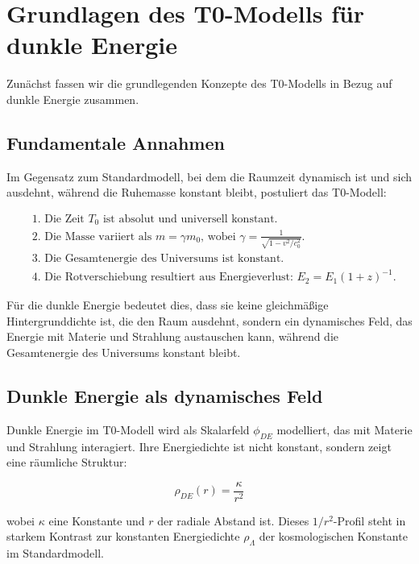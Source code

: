 \documentclass[a4paper,12pt]{article}
\theoremstyle{definition}
\theoremstyle{remark}
\begin{document}
	\section{Grundlagen des T0-Modells für dunkle Energie}
	Zunächst fassen wir die grundlegenden Konzepte des T0-Modells in Bezug auf dunkle Energie zusammen.
	
	\subsection{Fundamentale Annahmen}
	Im Gegensatz zum Standardmodell, bei dem die Raumzeit dynamisch ist und sich ausdehnt, während die Ruhemasse konstant bleibt, postuliert das T0-Modell:
	
	\begin{tcolorbox}[colback=blue!5!white,colframe=blue!75!black,title=Fundamentale Annahmen des T0-Modells]
		\begin{align}
			&\text{1. Die Zeit $T_0$ ist absolut und universell konstant.} \\
			&\text{2. Die Masse variiert als $m = \gamma m_0$, wobei $\gamma = \frac{1}{\sqrt{1-v^2/c_0^2}}$.} \\
			&\text{3. Die Gesamtenergie des Universums ist konstant.} \\
			&\text{4. Die Rotverschiebung resultiert aus Energieverlust: $E_2 = E_1(1+z)^{-1}$.}
		\end{align}
	\end{tcolorbox}
	
	Für die dunkle Energie bedeutet dies, dass sie keine gleichmäßige Hintergrunddichte ist, die den Raum ausdehnt, sondern ein dynamisches Feld, das Energie mit Materie und Strahlung austauschen kann, während die Gesamtenergie des Universums konstant bleibt.
	
	\subsection{Dunkle Energie als dynamisches Feld}
	Dunkle Energie im T0-Modell wird als Skalarfeld $\phi_{DE}$ modelliert, das mit Materie und Strahlung interagiert. Ihre Energiedichte ist nicht konstant, sondern zeigt eine räumliche Struktur:
	
	\begin{equation}
		\rho_{DE}(r) = \frac{\kappa}{r^2}
	\end{equation}
	
	wobei $\kappa$ eine Konstante und $r$ der radiale Abstand ist. Dieses $1/r^2$-Profil steht in starkem Kontrast zur konstanten Energiedichte $\rho_\Lambda$ der kosmologischen Konstante im Standardmodell.
	
\end{document}

